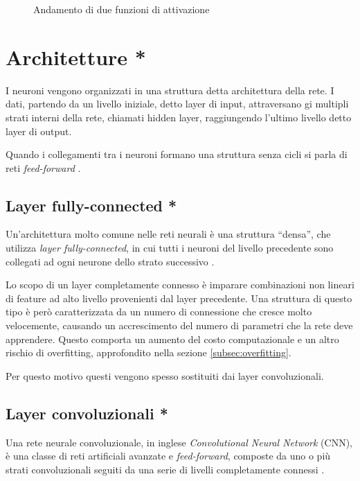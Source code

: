 \begin{figure}[htb]
	\centering
	\quad
	
	\caption{Andamento di due funzioni di attivazione}
	\label{fig:subfig}
\end{figure}

\section{Architetture *}
\label{sec:architetture}

I neuroni vengono organizzati in una struttura detta architettura della rete.
I dati, partendo da un livello iniziale, detto layer di input, attraversano gi multipli strati interni della rete, chiamati hidden layer, raggiungendo l'ultimo livello detto layer di output.

Quando i collegamenti tra i neuroni formano una struttura senza cicli si parla di reti \emph{feed-forward} \cite{svozil1997introduction}.

\subsection{Layer fully-connected *}
\label{subsec:fc}

Un’architettura molto comune nelle reti neurali è una struttura ``densa'', che utilizza \emph{layer fully-connected}, in cui tutti i neuroni del livello precedente sono collegati ad ogni neurone dello strato successivo \cite{sainath2015convolutional}.

Lo scopo di un layer completamente connesso è imparare combinazioni non lineari di feature ad alto livello provenienti dal layer precedente. 
Una struttura di questo tipo è però caratterizzata da un numero di connessione che cresce molto velocemente, causando un accrescimento del numero di parametri che la rete deve apprendere.
Questo comporta un aumento del costo computazionale e un altro rischio di overfitting, approfondito nella sezione \ref{subsec:overfitting}.

Per questo motivo questi vengono spesso sostituiti dai layer convoluzionali.

\subsection{Layer convoluzionali *}
\label{subsec:cnn}
Una rete neurale convoluzionale, in inglese \emph{Convolutional Neural Network} (CNN), è una classe di reti artificiali avanzate e \emph{feed-forward}, composte da uno o più strati convoluzionali seguiti da una serie di livelli completamente connessi \cite{kim2014convolutional}.

